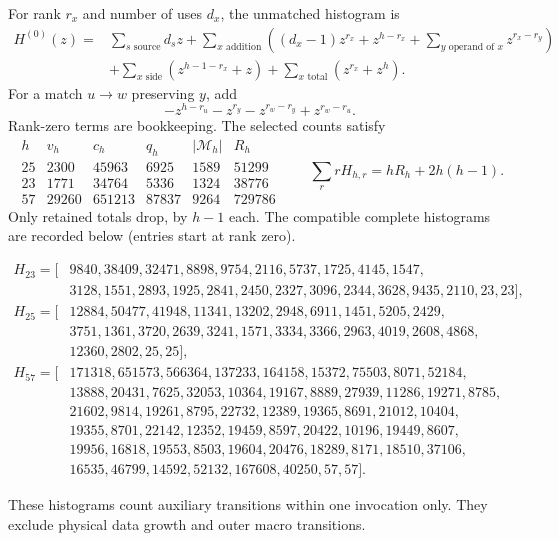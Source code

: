 For rank $r_x$ and number of uses $d_x$, the unmatched histogram is
\begin{align*}
 H^{(0)}(z)={}&\sum_{s\text{ source}}d_sz
 +\sum_{x\text{ addition}}\left((d_x-1)z^{r_x}+z^{h-r_x}
                  +\sum_{y\text{ operand of }x}z^{r_x-r_y}\right)\\
 &+\sum_{x\text{ side}}(z^{h-1-r_x}+z)
 +\sum_{x\text{ total}}(z^{r_x}+z^h).
\end{align*}
For a match $u\to w$ preserving $y$, add
\[
 -z^{h-r_u}-z^{r_y}-z^{r_w-r_y}+z^{r_w-r_u}.
\]
Rank-zero terms are bookkeeping. The selected counts satisfy
\[
\begin{array}{c|rrrrr}
 h&v_h&c_h&q_h&|\mathcal M_h|&R_h\\\hline
 25&2300&45963&6925&1589&51299\\
 23&1771&34764&5336&1324&38776\\
 57&29260&651213&87837&9264&729786
\end{array}
\qquad
 \sum_r rH_{h,r}=hR_h+2h(h-1).
\]
Only retained totals drop, by $h-1$ each. The compatible complete
histograms are recorded below (entries start at rank zero).
\begin{small}\begin{align*}
 H_{23}=[&9840,38409,32471,8898,9754,2116,5737,1725,4145,1547,\\
 &3128,1551,2893,1925,2841,2450,2327,3096,2344,3628,9435,2110,23,23],\\
 H_{25}=[&12884,50477,41948,11341,13202,2948,6911,1451,5205,2429,\\
 &3751,1361,3720,2639,3241,1571,3334,3366,2963,4019,2608,4868,\\
 &12360,2802,25,25],\\
 H_{57}=[&171318,651573,566364,137233,164158,15372,75503,8071,52184,\\
 &13888,20431,7625,32053,10364,19167,8889,27939,11286,19271,8785,\\
 &21602,9814,19261,8795,22732,12389,19365,8691,21012,10404,\\
 &19355,8701,22142,12352,19459,8597,20422,10196,19449,8607,\\
 &19956,16818,19553,8503,19604,20476,18289,8171,18510,37106,\\
 &16535,46799,14592,52132,167608,40250,57,57].
\end{align*}\end{small}
These histograms count auxiliary transitions within one invocation only.
They exclude physical data growth and outer macro transitions.

